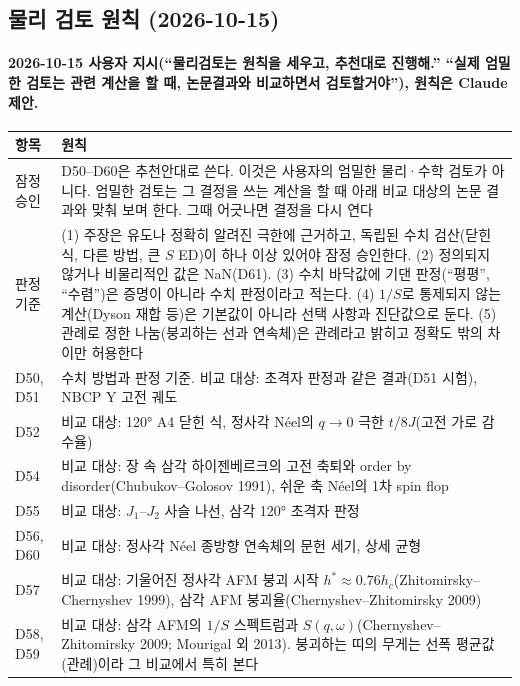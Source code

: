 \subsection{물리 검토 원칙 (2026-10-15)}\label{decisions-physics-review-principles}
\begingroup%
  \framesubtitle{2026-10-15 사용자 지시(``물리검토는 원칙을 세우고, 추천대로 진행해.'' ``실제 엄밀한 검토는 관련 계산을 할 때, 논문결과와 비교하면서 검토할거야''), 원칙은 Claude 제안.}
  \small\renewcommand{\arraystretch}{1.12}
  \begin{tabularx}{\textwidth}{@{}P{3.0cm}Y@{}}
    \toprule
    항목 & 원칙 \\
    \midrule
    잠정 승인 & D50--D60은 추천안대로 쓴다. 이것은 사용자의 엄밀한 물리·수학 검토가 아니다. 엄밀한 검토는 그 결정을 쓰는 계산을 할 때 아래 비교 대상의 논문 결과와 맞춰 보며 한다. 그때 어긋나면 결정을 다시 연다 \\
    판정 기준 & (1) 주장은 유도나 정확히 알려진 극한에 근거하고, 독립된 수치 검산(닫힌 식, 다른 방법, 큰 $S$ ED)이 하나 이상 있어야 잠정 승인한다. (2) 정의되지 않거나 비물리적인 값은 NaN(D61). (3) 수치 바닥값에 기댄 판정(``평평'', ``수렴'')은 증명이 아니라 수치 판정이라고 적는다. (4) $1/S$로 통제되지 않는 계산(Dyson 재합 등)은 기본값이 아니라 선택 사항과 진단값으로 둔다. (5) 관례로 정한 나눔(붕괴하는 선과 연속체)은 관례라고 밝히고 정확도 밖의 차이만 허용한다 \\
    D50, D51 & 수치 방법과 판정 기준. 비교 대상: 초격자 판정과 같은 결과(D51 시험), NBCP Y 고전 궤도 \\
    D52 & 비교 대상: 120° A4 닫힌 식, 정사각 Néel의 $q\to0$ 극한 $t/8J$(고전 가로 감수율) \\
    D54 & 비교 대상: 장 속 삼각 하이젠베르크의 고전 축퇴와 order by disorder(Chubukov--Golosov 1991), 쉬운 축 Néel의 1차 spin flop \\
    D55 & 비교 대상: $J_1$--$J_2$ 사슬 나선, 삼각 120° 초격자 판정 \\
    D56, D60 & 비교 대상: 정사각 Néel 종방향 연속체의 문헌 세기, 상세 균형 \\
    D57 & 비교 대상: 기울어진 정사각 AFM 붕괴 시작 $h^*\approx0.76h_c$(Zhitomirsky--Chernyshev 1999), 삼각 AFM 붕괴율(Chernyshev--Zhitomirsky 2009) \\
    D58, D59 & 비교 대상: 삼각 AFM의 $1/S$ 스펙트럼과 $S(q,\omega)$(Chernyshev--Zhitomirsky 2009; Mourigal 외 2013). 붕괴하는 띠의 무게는 선폭 평균값(관례)이라 그 비교에서 특히 본다 \\
    \bottomrule
  \end{tabularx}
\endgroup

